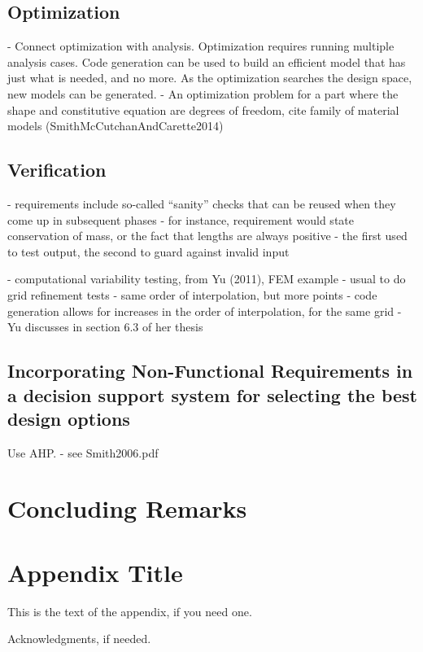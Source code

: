 \documentclass[10pt, preprint]{sigplanconf}
\begin{document}
\subsection{Optimization}
\label{subsec:optimization}

- Connect optimization with analysis.  Optimization requires running multiple analysis cases.  Code generation can be used to build an efficient model that has just what is needed, and no more.  As the optimization searches the design space, new models can be generated.
- An optimization problem for a part where the shape and constitutive equation are degrees of freedom, cite family of material models (SmithMcCutchanAndCarette2014)

\subsection{Verification}
\label{subsec:verification}

- requirements include so-called “sanity” checks that can be reused when they come up in subsequent phases
- for instance, requirement would state conservation of mass, or the fact that lengths are always positive - the first used to test output, the second to guard against invalid input

- computational variability testing, from Yu (2011), FEM example
- usual to do grid refinement tests - same order of interpolation, but more points
- code generation allows for increases in the order of interpolation, for the same grid
- Yu discusses in section 6.3 of her thesis

\subsection{Incorporating Non-Functional Requirements in a decision support system for selecting the best design options}
\label{subsec:incorporating}

Use AHP. - see Smith2006.pdf

\section{Concluding Remarks}
\label{sec:concluding}

\appendix
\section{Appendix Title}

This is the text of the appendix, if you need one.

\acks

Acknowledgments, if needed.





\begin{thebibliography}{}
\softraggedright


\end{thebibliography}
\end{document}

